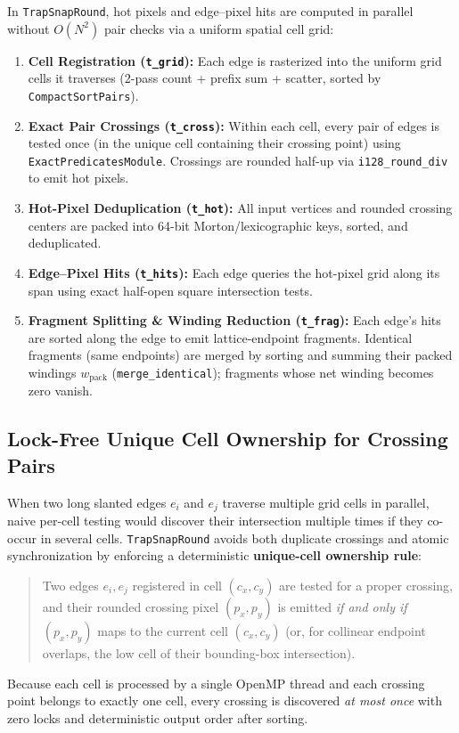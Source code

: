 In \texttt{TrapSnapRound}, hot pixels and edge--pixel hits are computed in parallel without $O(N^2)$ pair checks via a uniform spatial cell grid:
\begin{enumerate}
  \item \textbf{Cell Registration (\texttt{t\_grid}):} Each edge is rasterized into the uniform grid cells it traverses (2-pass count + prefix sum + scatter, sorted by \texttt{CompactSortPairs}).
  \item \textbf{Exact Pair Crossings (\texttt{t\_cross}):} Within each cell, every pair of edges is tested once (in the unique cell containing their crossing point) using \texttt{ExactPredicatesModule}. Crossings are rounded half-up via \texttt{i128\_round\_div} to emit hot pixels.
  \item \textbf{Hot-Pixel Deduplication (\texttt{t\_hot}):} All input vertices and rounded crossing centers are packed into 64-bit Morton/lexicographic keys, sorted, and deduplicated.
  \item \textbf{Edge--Pixel Hits (\texttt{t\_hits}):} Each edge queries the hot-pixel grid along its span using exact half-open square intersection tests.
  \item \textbf{Fragment Splitting \& Winding Reduction (\texttt{t\_frag}):} Each edge's hits are sorted along the edge to emit lattice-endpoint fragments. Identical fragments (same endpoints) are merged by sorting and summing their packed windings $w_{\text{pack}}$ (\texttt{merge\_identical}); fragments whose net winding becomes zero vanish.
\end{enumerate}

\subsection{Lock-Free Unique Cell Ownership for Crossing Pairs}

When two long slanted edges $e_i$ and $e_j$ traverse multiple grid cells in parallel, naive per-cell testing would discover their intersection multiple times if they co-occur in several cells. \texttt{TrapSnapRound} avoids both duplicate crossings and atomic synchronization by enforcing a deterministic \textbf{unique-cell ownership rule}:
\begin{quote}
  Two edges $e_i, e_j$ registered in cell $(c_x, c_y)$ are tested for a proper crossing, and their rounded crossing pixel $(p_x, p_y)$ is emitted \emph{if and only if} $(p_x, p_y)$ maps to the current cell $(c_x, c_y)$ (or, for collinear endpoint overlaps, the low cell of their bounding-box intersection).
\end{quote}
Because each cell is processed by a single OpenMP thread and each crossing point belongs to exactly one cell, every crossing is discovered \emph{at most once} with zero locks and deterministic output order after sorting.

